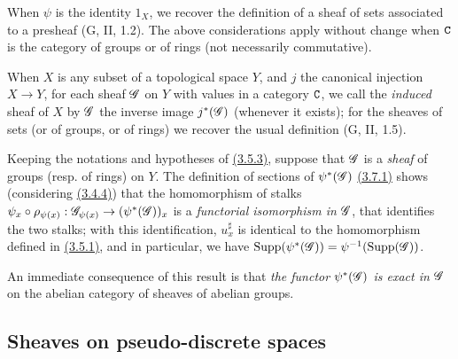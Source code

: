 \begin{env}[3.7.1]
When $\psi$ is the identity $1_X$, we recover the definition of a sheaf of sets
associated to a presheaf (G, II, 1.2). The above considerations apply without
change when $\mathtt{C}$ is the category of groups or of rings (not necessarily
commutative).

When $X$ is any subset of a topological space $Y$, and $j$ the canonical
injection $X\to Y$, for each sheaf $\mathscr{G}$ on $Y$ with values in a category
$\mathtt{C}$, we call the {\em induced} sheaf of $X$ by $\mathscr{G}$ the inverse image
$j^*(\mathscr{G})$ (whenever it exists); for the sheaves of sets (or of groups, or of
rings) we recover the usual definition (G, II, 1.5).
\end{env}

\begin{env}[3.7.2]
\label{0.3.7.2}
Keeping the notations and hypotheses of \hyperref[0.3.5.3]{(3.5.3)}, suppose that $\mathscr{G}$
is a {\em sheaf} of groups (resp. of rings) on $Y$. The definition of sections
of $\psi^*(\mathscr{G})$ \hyperref[0.3.7.1]{(3.7.1)} shows (considering \hyperref[0.3.4.4]{(3.4.4)}) that
the homomorphism of stalks
$\psi_x\circ\rho_{\psi(x)}:\mathscr{G}_{\psi(x)}\to(\psi^*(\mathscr{G}))_x$ is a
{\em functorial isomorphism in $\mathscr{G}$}, that identifies the two stalks; with
this identification, $u_x^\sharp$ is identical to the homomorphism defined in
\hyperref[0.3.5.1]{(3.5.1)}, and in particular, we have
${\mathop{\mathrm{Supp}}\nolimits}(\psi^*(\mathscr{G}))=\psi^{-1}({\mathop{\mathrm{Supp}}\nolimits}(\mathscr{G}))$.

An immediate consequence of this result is that {\em the functor
$\psi^*(\mathscr{G})$ is exact in $\mathscr{G}$} on the abelian category of sheaves of
abelian groups.
\end{env}

\subsection{Sheaves on pseudo-discrete spaces}
\label{subsection-sheaves-on-pseudo-discrete-spaces}

